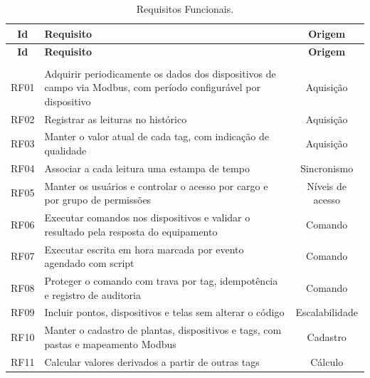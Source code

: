 {\renewcommand{\arraystretch}{1.3}\small
\begin{xltabular}{\textwidth}{c>{\centering\arraybackslash}Xc}
        \caption{Requisitos Funcionais.}
        \label{tab:requisitos_funcionais}\\
        \hline
        \textbf{Id} & \textbf{Requisito} & \textbf{Origem} \\
        \hline
        \endfirsthead
        \hline
        \textbf{Id} & \textbf{Requisito} & \textbf{Origem} \\
        \hline
        \endhead
        \endfoot
         \\
        \endlastfoot
        RF01        & Adquirir periodicamente os dados dos dispositivos de campo via Modbus, com período configurável por dispositivo & Aquisição        \\
        \hline
        RF02        & Registrar as leituras no histórico & Aquisição        \\
        \hline
        RF03        & Manter o valor atual de cada tag, com indicação de qualidade                    & Aquisição        \\
        \hline
        RF04        & Associar a cada leitura uma estampa de tempo                                                & Sincronismo      \\
        \hline
        RF05        & Manter os usuários e controlar o acesso por cargo e por grupo de permissões                                              & Níveis de acesso \\
        \hline
        RF06        & Executar comandos nos dispositivos e validar o resultado pela resposta do equipamento      & Comando          \\
        \hline
        RF07        & Executar escrita em hora marcada por evento agendado com script         & Comando          \\
        \hline
        RF08        & Proteger o comando com trava por tag, idempotência e registro de auditoria          & Comando          \\
        \hline
        RF09        & Incluir pontos, dispositivos e telas sem alterar o código                                  & Escalabilidade   \\
        \hline
        RF10        & Manter o cadastro de plantas, dispositivos e tags, com pastas e mapeamento Modbus & Cadastro         \\
        \hline
        RF11        & Calcular valores derivados a partir de outras tags                                     & Cálculo          \\

\end{xltabular}}
